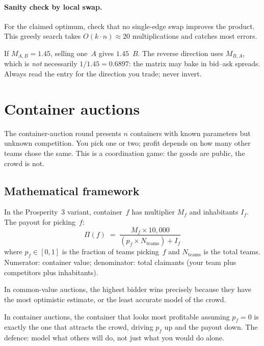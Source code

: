 \paragraph{Sanity check by local swap.}
For the claimed optimum, check that no single-edge swap improves
the product.  This greedy search takes $O(k \cdot n) \approx 20$
multiplications and catches most errors.

\begin{pitfallbox}
If $M_{A,B} = 1.45$, selling one~$A$ gives $1.45$~$B$.  The
reverse direction uses $M_{B,A}$, which is \emph{not} necessarily
$1/1.45 = 0.6897$: the matrix may bake in bid--ask spreads.
Always read the entry for the direction you trade; never invert.
\end{pitfallbox}


\section{Container auctions}
\label{sec:ch25_containers}

The container-auction round presents $n$ containers with known
parameters but unknown competition.  You pick one or two; profit
depends on how many other teams chose the same.  This is a
coordination game: the goods are public, the crowd is not.

\subsection{Mathematical framework}

In the Prosperity~3 variant, container~$f$ has multiplier $M_f$
and inhabitants $I_f$.  The payout for picking~$f$:
\begin{equation}
  \Pi(f)
  \;=\;
  \frac{M_f \times 10{,}000}{(p_f \times N_{\text{teams}}) + I_f}
  \label{eq:ch25_container_payoff}
\end{equation}
where $p_f \in [0,1]$ is the fraction of teams picking~$f$ and
$N_{\text{teams}}$ is the total teams.  Numerator: container value;
denominator: total claimants (your team plus competitors plus
inhabitants).

\begin{keyfactbox}
In common-value auctions, the highest bidder wins precisely
because they have the most optimistic estimate, or the least
accurate model of the crowd.

In container auctions, the container that looks most profitable
assuming $p_f = 0$ is exactly the one that attracts the crowd,
driving $p_f$ up and the payout down.  The defence: model what
others will do, not just what you would do alone.
\end{keyfactbox}

